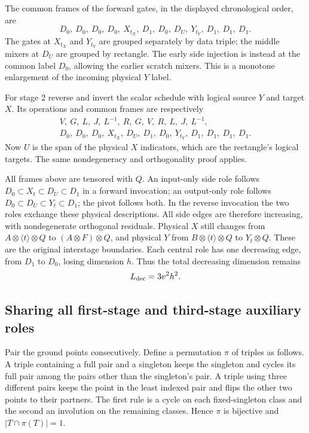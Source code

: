 The common frames of the forward gates, in the displayed chronological order,
are
\[
 D_0,\ D_0,\ D_0,\ D_0,\ X_{t_X},\ D_1,\ D_0,\
 D_U,\ Y_{t_Y},\ D_1,\ D_1,\ D_1.
\]
The gates at $X_{t_X}$ and $Y_{t_Y}$ are grouped separately by data triple;
the middle mixers at $D_U$ are grouped by rectangle. The early side injection
is instead at the common label $D_0$, allowing the earlier scratch mixers.
This is a monotone enlargement of the incoming physical $Y$ label.

For stage 2 reverse and invert the scalar schedule with logical source $Y$
and target $X$. Its operations and common frames are respectively
\begin{gather*}
 V,\ G,\ L,\ J,\ L^{-1},\ R,\ G,\ V,\ R,\ L,\ J,\ L^{-1},\\
 D_0,\ D_0,\ D_0,\ X_{t_X},\ D_U,\ D_1,\ D_0,\
 Y_{t_Y},\ D_1,\ D_1,\ D_1,\ D_1.
\end{gather*}
Now $U$ is the span of the physical $X$ indicators, which are the rectangle's
logical targets. The same nondegeneracy and orthogonality proof applies.

All frames above are tensored with $Q$. An input-only side role follows
$D_0\subset X_t\subset D_U\subset D_1$ in a forward invocation;
an output-only role follows $D_0\subset D_U\subset Y_t\subset D_1$;
the pivot follows both. In the reverse invocation the two roles exchange
these physical descriptions. All side edges are therefore increasing, with
nondegenerate orthogonal residuals. Physical $X$ still changes from
$A\otimes\langle t\rangle\otimes Q$ to $(A\otimes F)\otimes Q$,
and physical $Y$ from $B\otimes\langle t\rangle\otimes Q$ to
$Y_t\otimes Q$. These are the original interstage boundaries.
Each central role has one decreasing edge, from $D_1$ to $D_0$, losing
dimension $h$. Thus the total decreasing dimension remains
\[
 L_{\rm dec}=3v^2h^2.
\]

\subsection{Sharing all first-stage and third-stage auxiliary roles}
Pair the ground points consecutively. Define a permutation $\pi$ of triples
as follows. A triple containing a full pair and a singleton keeps the singleton
and cycles its full pair among the pairs other than the singleton's pair.
A triple using three different pairs keeps the point in the least indexed
pair and flips the other two points to their partners. The first rule is a
cycle on each fixed-singleton class and the second an involution on the
remaining classes. Hence $\pi$ is bijective and $|T\cap\pi(T)|=1$.

